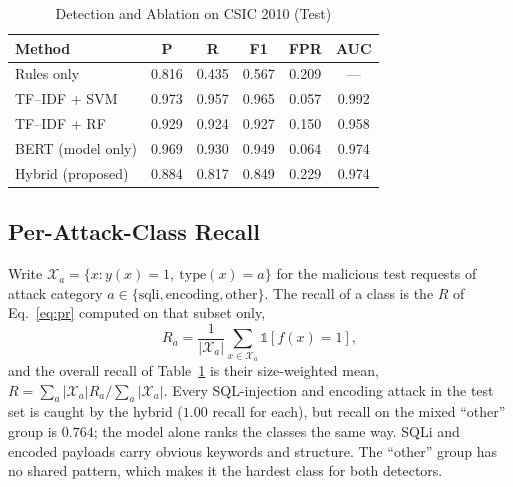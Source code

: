 \documentclass[conference]{IEEEtran}
\begin{document}
\begin{table}[t]
\centering
\caption{Detection and Ablation on CSIC 2010 (Test)}
\label{tab:main}
\begin{tabular}{@{}lccccc@{}}
\toprule
Method & P & R & F1 & FPR & AUC \\
\midrule
Rules only            & 0.816 & 0.435 & 0.567 & 0.209 & --- \\
TF--IDF + SVM         & 0.973 & 0.957 & 0.965 & 0.057 & 0.992 \\
TF--IDF + RF          & 0.929 & 0.924 & 0.927 & 0.150 & 0.958 \\
BERT (model only)     & 0.969 & 0.930 & 0.949 & 0.064 & 0.974 \\
Hybrid (proposed)         & 0.884 & 0.817 & 0.849 & 0.229 & 0.974 \\
\bottomrule
\end{tabular}
\end{table}

\subsection{Per-Attack-Class Recall}
Write $\mathcal{X}_a=\{x : y(x)=1,\ \mathrm{type}(x)=a\}$ for the malicious
test requests of attack category $a\in\{\text{sqli},
\text{encoding},\text{other}\}$. The recall of a class is the $R$ of
Eq.~\eqref{eq:pr} computed on that subset only,
\begin{equation}
R_a = \frac{1}{|\mathcal{X}_a|}\sum_{x\in\mathcal{X}_a} \mathbb{1}[f(x)=1],
\label{eq:perclass}
\end{equation}
and the overall recall of Table~\ref{tab:main} is their size-weighted
mean, $R=\sum_a |\mathcal{X}_a| R_a / \sum_a |\mathcal{X}_a|$. Every
SQL-injection and encoding attack in the test set is caught by the hybrid
($1.00$ recall for each), but recall on the mixed ``other'' group is
$0.764$; the model alone ranks the classes the same way. SQLi and encoded
payloads carry obvious keywords and structure. The ``other'' group has no
shared pattern, which makes it the hardest class for both detectors.
\end{document}
